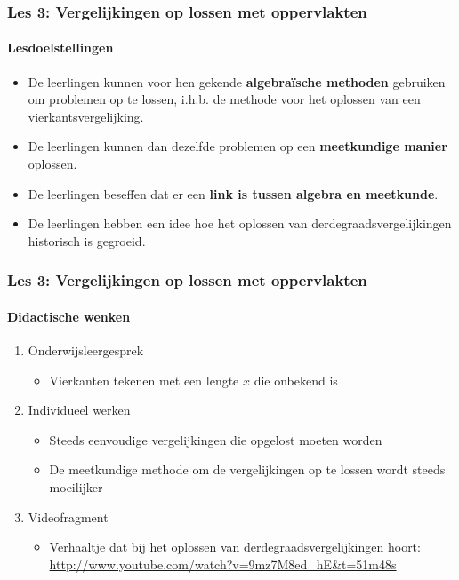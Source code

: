 \documentclass[dutch]{beamer}
\begin{document}
\begin{frame}
\frametitle{Les 3: Vergelijkingen op lossen met oppervlakten}
\framesubtitle{Lesdoelstellingen}
\begin{itemize}
  \item De leerlingen kunnen voor hen gekende {\bf algebra\"ische methoden} gebruiken om problemen op te lossen, i.h.b. de methode voor het oplossen van een vierkantsvergelijking.
  \item De leerlingen kunnen dan dezelfde problemen op een {\bf meetkundige manier} oplossen.
  \item De leerlingen beseffen dat er een {\bf link is tussen algebra en meetkunde}.
  \item De leerlingen hebben een idee hoe het oplossen van derdegraadsvergelijkingen historisch is gegroeid.
\end{itemize}
\end{frame}

\begin{frame}
  \frametitle{Les 3: Vergelijkingen op lossen met oppervlakten}
  \framesubtitle{Didactische wenken}
  \begin{enumerate}
    \item Onderwijsleergesprek
      \begin{itemize}
        \item Vierkanten tekenen met een lengte $x$ die onbekend is
      \end{itemize}
    \item Individueel werken
      \begin{itemize}
        \item Steeds eenvoudige vergelijkingen die opgelost moeten worden
        \item De meetkundige methode om de vergelijkingen op te lossen wordt steeds moeilijker
      \end{itemize}
    \item Videofragment
      \begin{itemize}
        \item Verhaaltje dat bij het oplossen van derdegraadsvergelijkingen hoort:\\
          {\scriptsize \url{http://www.youtube.com/watch?v=9mz7M8ed_hE&t=51m48s}}
      \end{itemize}
  \end{enumerate}
\end{frame}


\end{document}
